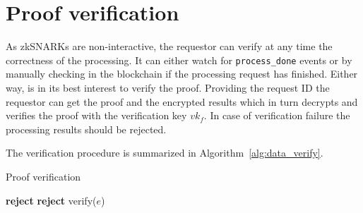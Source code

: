 \section{Proof verification}
\label{solution:flow:verify}

Αs zkSNARKs are non-interactive, the requestor can verify at any time the correctness of the processing. It can either watch for \verb|process_done| events or by manually checking in the blockchain if the processing request has finished. Either way, is in its best interest to verify the proof. Providing the request ID the requestor can get the proof and the encrypted results which in turn decrypts and verifies the proof with the verification key $vk_f$. In case of verification failure the processing results should be rejected.

The verification procedure is summarized in Algorithm~\ref{alg:data_verify}.

\begin{algorithm}[!htb]
  \caption{Proof verification}\label{alg:data_verify}
  \begin{algorithmic}[1]
     
     
     
     
      \State \textbf{reject}
    \EndIf
     
     
      \State \textbf{reject}
    \EndIf
  \EndProcedure
     
      \State verify($e$) 
    \EndWhile
  \EndProcedure
  \end{algorithmic}
\end{algorithm}

